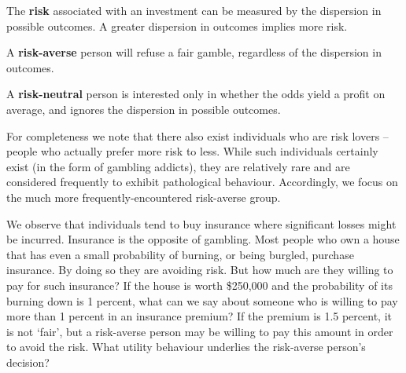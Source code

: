 \begin{DefBox}
The \textbf{risk} associated with an investment can be measured by the dispersion in possible outcomes. A greater dispersion in outcomes implies more risk.

A \textbf{risk-averse} person will refuse a fair gamble, regardless of the dispersion in outcomes.

A \textbf{risk-neutral} person is interested only in whether the odds yield a profit on average, and ignores the dispersion in possible outcomes.
\end{DefBox}

For completeness we note that there also exist individuals who are risk lovers -- people who actually prefer more risk to less. While such individuals certainly exist (in the form of gambling addicts), they are relatively rare and are considered frequently to exhibit pathological behaviour. Accordingly, we focus on the much more frequently-encountered risk-averse group.

We observe that individuals tend to buy insurance where significant losses might be incurred. Insurance is the opposite of gambling. Most people who own a house that has even a small probability of burning, or being burgled, purchase insurance. By doing so they are avoiding risk. But how much are they willing to pay for such insurance? If the house is worth \$250,000 and the probability of its burning down is 1 percent, what can we say about someone who is willing to pay more than 1 percent in an insurance premium? If the premium is 1.5 percent, it is not `fair', but a risk-averse person may be willing to pay this amount in order to avoid the risk. What utility behaviour underlies the risk-averse person's decision?

